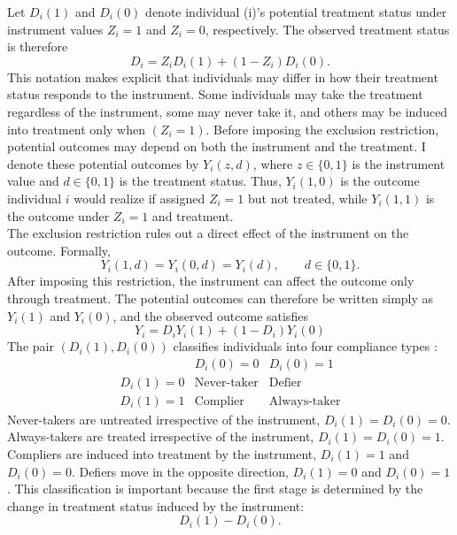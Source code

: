 \documentclass[12pt, a4paper, oneside]{article}
\theoremstyle{plain}
\theoremstyle{definition}
\begin{document}
Let $D_i(1)$ and $D_i(0)$ denote individual (i)'s potential treatment status under instrument values $Z_i=1$ and $Z_i=0$, respectively. The observed treatment status is therefore
\begin{equation}
    D_i = Z_iD_i(1)+(1-Z_i)D_i(0).
\end{equation}
This notation makes explicit that individuals may differ in how their treatment status responds to the instrument.
Some individuals may take the treatment regardless of the instrument, some may never take it, and others may be induced into treatment only when $(Z_i=1)$.
Before imposing the exclusion restriction, potential outcomes may depend on both the instrument and the treatment.
I denote these potential outcomes by $Y_i(z,d)$, where $z \in \{0,1\}$ is the 
instrument value and $d \in \{0,1\}$ is the treatment status. Thus, $Y_i(1,0)$ 
is the outcome individual $i$ would realize if assigned $Z_i=1$ but not treated, 
while $Y_i(1,1)$ is the outcome under $Z_i=1$ and treatment.\\
The exclusion restriction rules out a direct effect of the instrument on the outcome. Formally,
\begin{equation}
    Y_i(1,d)=Y_i(0,d)=Y_i(d), \qquad d \in \{0,1\}.
\end{equation}
After imposing this restriction, the instrument can affect the outcome only through 
treatment. The potential outcomes can therefore be written simply as $Y_i(1)$ and 
$Y_i(0)$, and the observed outcome satisfies
\begin{equation}
    Y_i = D_i Y_i(1) + (1-D_i) Y_i(0)
\end{equation}
The pair $(D_i(1),D_i(0))$ classifies individuals into four compliance types \citep{angrist1996identification}:
$$\begin{array}{c|cc}
 & D_i(0)=0 & D_i(0)=1 \\
\hline
D_i(1)=0 & \text{Never-taker} & \text{Defier} \\
D_i(1)=1 & \text{Complier} & \text{Always-taker}
\end{array}$$
Never-takers are untreated irrespective of the instrument, $D_i(1)=D_i(0)=0$. 
Always-takers are treated irrespective of the instrument, $D_i(1)=D_i(0)=1$. 
Compliers are induced into treatment by the instrument, $D_i(1)=1$ and $D_i(0)=0$. 
Defiers move in the opposite direction, $D_i(1)=0$ and $D_i(0)=1$.
This classification is important because the first stage is determined by the change in treatment status induced by the instrument:
\begin{equation}
D_i(1)-D_i(0).
\end{equation}
\end{document}
